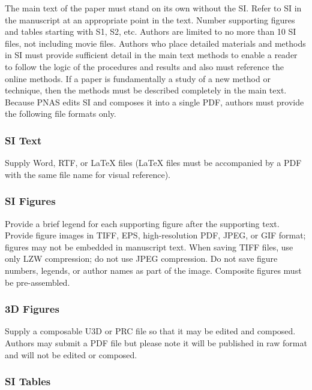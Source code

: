 \documentclass[9pt,twocolumn,twoside,]{pnas-new}
\begin{document}
The main text of the paper must stand on its own without the SI. Refer
to SI in the manuscript at an appropriate point in the text. Number
supporting figures and tables starting with S1, S2, etc. Authors are
limited to no more than 10 SI files, not including movie files. Authors
who place detailed materials and methods in SI must provide sufficient
detail in the main text methods to enable a reader to follow the logic
of the procedures and results and also must reference the online
methods. If a paper is fundamentally a study of a new method or
technique, then the methods must be described completely in the main
text. Because PNAS edits SI and composes it into a single PDF, authors
must provide the following file formats only.

\subsubsection*{SI Text}\label{si-text}

Supply Word, RTF, or LaTeX files (LaTeX files must be accompanied by a
PDF with the same file name for visual reference).

\subsubsection*{SI Figures}\label{si-figures}

Provide a brief legend for each supporting figure after the supporting
text. Provide figure images in TIFF, EPS, high-resolution PDF, JPEG, or
GIF format; figures may not be embedded in manuscript text. When saving
TIFF files, use only LZW compression; do not use JPEG compression. Do
not save figure numbers, legends, or author names as part of the image.
Composite figures must be pre-assembled.

\subsubsection*{3D Figures}\label{d-figures}

Supply a composable U3D or PRC file so that it may be edited and
composed. Authors may submit a PDF file but please note it will be
published in raw format and will not be edited or composed.

\subsubsection*{SI Tables}\label{si-tables}
\end{document}
